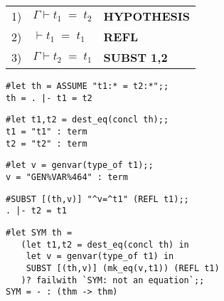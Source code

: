 \vskip7mm
\bspindent\LARGE\bf\vskip7mm
\begin{tabular}{l l @{\qquad} l}
1) & \( \Gamma \vdash t_1 \; = \; t_2 \) & {\Large\bf HYPOTHESIS} \\
2) & \( \vdash t_1 \; = \; t_1  \)       & {\Large\bf REFL}\\
3) & \( \Gamma \vdash t_2 \; = \; t_1 \) & {\Large\bf SUBST 1,2}
\end{tabular}
\espindent
\vskip7mm




\vskip 4mm
\begin{session}\begin{verbatim}
#let th = ASSUME "t1:* = t2:*";;
th = . |- t1 = t2
\end{verbatim}\end{session}

\vskip 4mm
\begin{session}\begin{verbatim}
#let t1,t2 = dest_eq(concl th);;
t1 = "t1" : term
t2 = "t2" : term
\end{verbatim}\end{session}

\vskip 4mm
\begin{session}\begin{verbatim}
#let v = genvar(type_of t1);;
v = "GEN%VAR%464" : term
\end{verbatim}\end{session}

\vskip 4mm
\begin{session}\begin{verbatim}
#SUBST [(th,v)] "^v=^t1" (REFL t1);;
. |- t2 = t1
\end{verbatim}\end{session}




\vskip 4mm
\begin{session}\begin{verbatim}
#let SYM th =
   (let t1,t2 = dest_eq(concl th) in
    let v = genvar(type_of t1) in
    SUBST [(th,v)] (mk_eq(v,t1)) (REFL t1)
   )? failwith `SYM: not an equation`;;
SYM = - : (thm -> thm)
\end{verbatim}\end{session}

